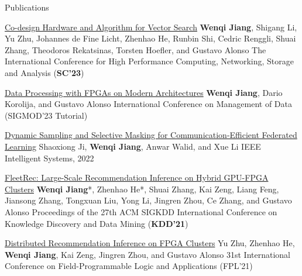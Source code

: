 \begin{rSection}{Publications}
\begin{enumerate}[label={[\arabic*]}]
\item
\begin{Pub}{\href{https://arxiv.org/pdf/2306.11182.pdf}{Co-design Hardware and Algorithm for Vector Search}}
{\textbf{Wenqi Jiang}, Shigang Li, Yu Zhu, Johannes de Fine Licht, Zhenhao He, Runbin Shi, Cedric Renggli, Shuai Zhang, Theodoros Rekatsinas, Torsten Hoefler, and Gustavo Alonso}
{The International Conference for High Performance Computing, Networking, Storage and Analysis (\textbf{SC'23})}
\end{Pub}

\item
\begin{Pub}{\href{https://dl.acm.org/doi/pdf/10.1145/3555041.3589410?casa_token=VwR_uiM-hLgAAAAA:sDCBaEV-PwKO07yGNkngnVlxywHnp61rkL4M7aFE8FlIC5RXgoBkAWR9zV-pYHiOdRchNpOOHIi2zAE}{Data Processing with FPGAs on Modern Architectures}}
{\textbf{Wenqi Jiang}, Dario Korolija, and Gustavo Alonso}
{International Conference on Management of Data (SIGMOD'23 Tutorial)}
\end{Pub}

\item
\begin{Pub}{\href{https://ieeexplore.ieee.org/abstract/document/9546691}{Dynamic Sampling and Selective Masking for Communication-Efficient Federated Learning}}
{Shaoxiong Ji, \textbf{Wenqi Jiang}, Anwar Walid, and Xue Li}
{IEEE Intelligent Systems, 2022 }
\end{Pub}

\item
\begin{Pub}{\href{https://dl.acm.org/doi/abs/10.1145/3447548.3467139?casa_token=KETIiL8HG6oAAAAA:rOygoffuHx-V_HjsNReM1ErnbH1AsOt6EJgp8odg7fUJHWhFb1c82hY0D4U8PoZf7G9TOP8QMToG2A}{FleetRec: Large-Scale Recommendation Inference on Hybrid GPU-FPGA Clusters}}
{\textbf{Wenqi Jiang}*, Zhenhao He*, Shuai Zhang, Kai Zeng, Liang Feng, Jiansong Zhang, Tongxuan Liu, Yong Li, Jingren Zhou, Ce Zhang, and Gustavo Alonso}
{Proceedings of the 27th ACM SIGKDD International Conference on Knowledge Discovery and Data Mining (\textbf{KDD'21})}
\end{Pub}

\item
\begin{Pub}{\href{https://ieeexplore.ieee.org/abstract/document/9556456?casa_token=i6-KNe_mgqQAAAAA:XVVQqTyccq7JC8hKFzoVbkwvpdTm544dKUPoEJEa13erbeNJc0WyqkLmgwIwscVQ8nQcYGx15JI}{Distributed Recommendation Inference on FPGA Clusters}}
{Yu Zhu, Zhenhao He, \textbf{Wenqi Jiang}, Kai Zeng, Jingren Zhou, and Gustavo Alonso}
{31st International Conference on Field-Programmable Logic and Applications (FPL'21)}
\end{Pub}


\end{enumerate}
\end{rSection}
